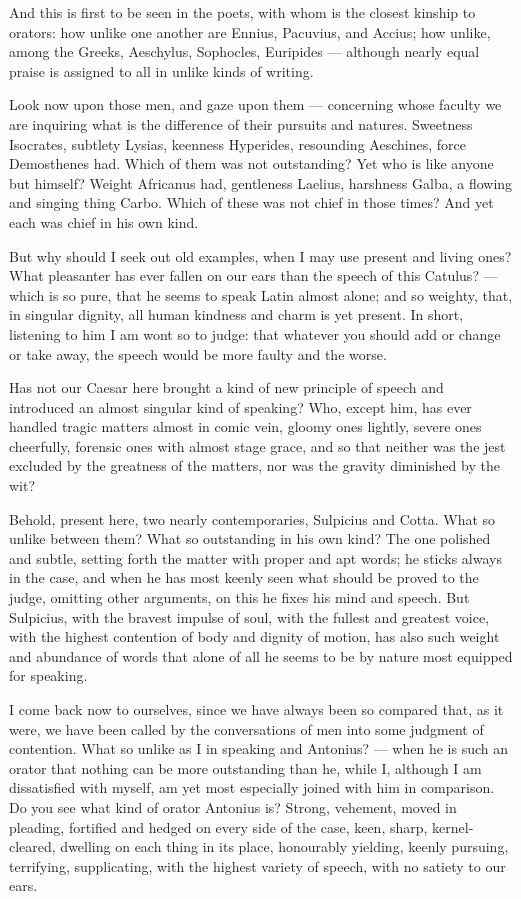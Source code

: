  And this is first to be seen in the poets, with whom is the closest kinship to orators: how unlike one another are Ennius, Pacuvius, and Accius; how unlike, among the Greeks, Aeschylus, Sophocles, Euripides — although nearly equal praise is assigned to all in unlike kinds of writing.

 Look now upon those men, and gaze upon them — concerning whose faculty we are inquiring what is the difference of their pursuits and natures. Sweetness Isocrates, subtlety Lysias, keenness Hyperides, resounding Aeschines, force Demosthenes had. Which of them was not outstanding? Yet who is like anyone but himself? Weight Africanus had, gentleness Laelius, harshness Galba, a flowing and singing thing Carbo. Which of these was not chief in those times? And yet each was chief in his own kind.

 But why should I seek out old examples, when I may use present and living ones? What pleasanter has ever fallen on our ears than the speech of this Catulus? — which is so pure, that he seems to speak Latin almost alone; and so weighty, that, in singular dignity, all human kindness and charm is yet present. In short, listening to him I am wont so to judge: that whatever you should add or change or take away, the speech would be more faulty and the worse.

 Has not our Caesar here brought a kind of new principle of speech and introduced an almost singular kind of speaking? Who, except him, has ever handled tragic matters almost in comic vein, gloomy ones lightly, severe ones cheerfully, forensic ones with almost stage grace, and so that neither was the jest excluded by the greatness of the matters, nor was the gravity diminished by the wit?

 Behold, present here, two nearly contemporaries, Sulpicius and Cotta. What so unlike between them? What so outstanding in his own kind? The one polished and subtle, setting forth the matter with proper and apt words; he sticks always in the case, and when he has most keenly seen what should be proved to the judge, omitting other arguments, on this he fixes his mind and speech. But Sulpicius, with the bravest impulse of soul, with the fullest and greatest voice, with the highest contention of body and dignity of motion, has also such weight and abundance of words that alone of all he seems to be by nature most equipped for speaking.

 I come back now to ourselves, since we have always been so compared that, as it were, we have been called by the conversations of men into some judgment of contention. What so unlike as I in speaking and Antonius? — when he is such an orator that nothing can be more outstanding than he, while I, although I am dissatisfied with myself, am yet most especially joined with him in comparison. Do you see what kind of orator Antonius is? Strong, vehement, moved in pleading, fortified and hedged on every side of the case, keen, sharp, kernel-cleared, dwelling on each thing in its place, honourably yielding, keenly pursuing, terrifying, supplicating, with the highest variety of speech, with no satiety to our ears.

